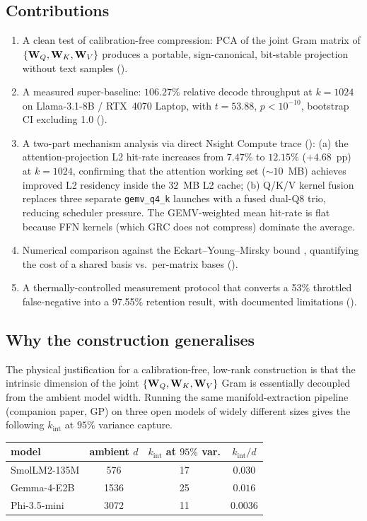 \documentclass[11pt]{article}
\begin{document}
\subsection{Contributions}
\begin{enumerate}
\item A clean test of calibration-free compression: PCA of the joint Gram
matrix of $\{\mathbf{W}_Q,\mathbf{W}_K,\mathbf{W}_V\}$ produces a portable, sign-canonical,
bit-stable projection without text samples ().
\item A measured super-baseline: $106.27\%$ relative decode throughput
at $k{=}1024$ on Llama-3.1-8B / RTX~4070 Laptop, with $t{=}53.88$,
$p<10^{-10}$, bootstrap CI excluding 1.0 ().
\item A two-part mechanism analysis via direct Nsight Compute trace ():
(a) the attention-projection L2 hit-rate increases from $7.47\%$ to $12.15\%$
($+4.68$~pp) at $k{=}1024$, confirming that the attention working set ($\sim 10$~MB)
achieves improved L2 residency inside the $32$~MB L2 cache; (b) Q/K/V kernel
fusion replaces three separate \texttt{gemv\_q4\_k} launches with a fused dual-Q8
trio, reducing scheduler pressure. The GEMV-weighted mean hit-rate is flat
because FFN kernels (which GRC does not compress) dominate the average.
\item Numerical comparison against the Eckart--Young--Mirsky bound
\cite{eckart1936}, quantifying the cost of a shared basis vs.\ per-matrix
bases ().
\item A thermally-controlled measurement protocol that converts a 53\%
throttled false-negative into a 97.55\% retention result, with
documented limitations ().
\end{enumerate}
\subsection{Why the construction generalises}
\label{sec:intrinsic-dim}
The physical justification for a calibration-free, low-rank construction is
that the intrinsic dimension of the joint $\{\mathbf{W}_Q,\mathbf{W}_K,\mathbf{W}_V\}$ Gram
is essentially decoupled from the ambient model width. Running the same
manifold-extraction pipeline (companion paper, GP) on three open models of
widely different sizes gives the following $k_{\mathrm{int}}$ at $95\%$
variance capture.

\begin{center}\small
\begin{tabular}{lccc}\toprule
model & ambient $d$ & $k_{\mathrm{int}}$ at $95\%$ var. & $k_{\mathrm{int}}/d$\\\midrule
SmolLM2-135M   & 576  & 17 & $0.030$\\
Gemma-4-E2B    & 1536 & 25 & $0.016$\\
Phi-3.5-mini   & 3072 & 11 & $0.0036$\\\bottomrule
\end{tabular}\end{center}
\end{document}
